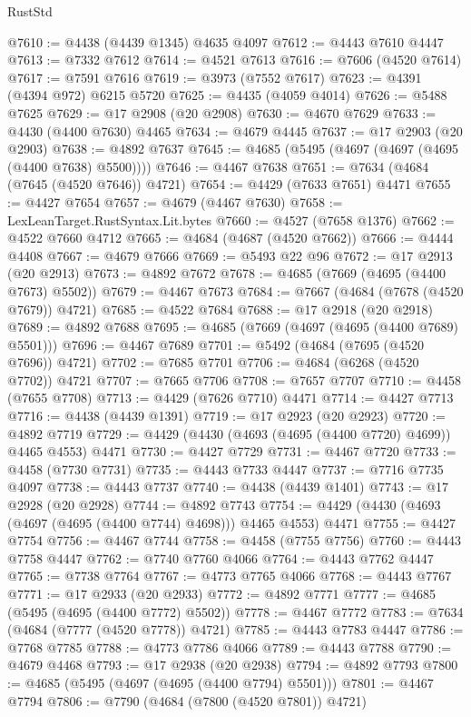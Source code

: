 \begin{lexlean}{RustStd}
\begin{coremodule}
{\begin{coremodule}
{{{{{{{{{{{{{{{{{{{{{{{{{{{{{{{{{{{{{{{{{{{{{{{{{{{{{{{{{{{{{{{{{{{{@7610 := @4438 (@4439 @1345) @4635 @4097
@7612 := @4443 @7610 @4447
@7613 := @7332 @7612
@7614 := @4521 @7613
@7616 := @7606 (@4520 @7614)
@7617 := @7591 @7616
@7619 := @3973 (@7552 @7617)
@7623 := @4391 (@4394 @972) @6215 @5720
@7625 := @4435 (@4059 @4014)
@7626 := @5488 @7625
@7629 := @17 @2908 (@20 @2908)
@7630 := @4670 @7629
@7633 := @4430 (@4400 @7630) @4465
@7634 := @4679 @4445
@7637 := @17 @2903 (@20 @2903)
@7638 := @4892 @7637
@7645 := @4685 (@5495 (@4697 (@4697 (@4695 (@4400 @7638) @5500))))
@7646 := @4467 @7638
@7651 := @7634 (@4684 (@7645 (@4520 @7646)) @4721)
@7654 := @4429 (@7633 @7651) @4471
@7655 := @4427 @7654
@7657 := @4679 (@4467 @7630)
@7658 := LexLeanTarget.RustSyntax.Lit.bytes
@7660 := @4527 (@7658 @1376)
@7662 := @4522 @7660 @4712
@7665 := @4684 (@4687 (@4520 @7662))
@7666 := @4444 @4408
@7667 := @4679 @7666
@7669 := @5493 @22 @96
@7672 := @17 @2913 (@20 @2913)
@7673 := @4892 @7672
@7678 := @4685 (@7669 (@4695 (@4400 @7673) @5502))
@7679 := @4467 @7673
@7684 := @7667 (@4684 (@7678 (@4520 @7679)) @4721)
@7685 := @4522 @7684
@7688 := @17 @2918 (@20 @2918)
@7689 := @4892 @7688
@7695 := @4685 (@7669 (@4697 (@4695 (@4400 @7689) @5501)))
@7696 := @4467 @7689
@7701 := @5492 (@4684 (@7695 (@4520 @7696)) @4721)
@7702 := @7685 @7701
@7706 := @4684 (@6268 (@4520 @7702)) @4721
@7707 := @7665 @7706
@7708 := @7657 @7707
@7710 := @4458 (@7655 @7708)
@7713 := @4429 (@7626 @7710) @4471
@7714 := @4427 @7713
@7716 := @4438 (@4439 @1391)
@7719 := @17 @2923 (@20 @2923)
@7720 := @4892 @7719
@7729 := @4429 (@4430 (@4693 (@4695 (@4400 @7720) @4699)) @4465 @4553) @4471
@7730 := @4427 @7729
@7731 := @4467 @7720
@7733 := @4458 (@7730 @7731)
@7735 := @4443 @7733 @4447
@7737 := @7716 @7735 @4097
@7738 := @4443 @7737
@7740 := @4438 (@4439 @1401)
@7743 := @17 @2928 (@20 @2928)
@7744 := @4892 @7743
@7754 := @4429 (@4430 (@4693 (@4697 (@4695 (@4400 @7744) @4698))) @4465 @4553) @4471
@7755 := @4427 @7754
@7756 := @4467 @7744
@7758 := @4458 (@7755 @7756)
@7760 := @4443 @7758 @4447
@7762 := @7740 @7760 @4066
@7764 := @4443 @7762 @4447
@7765 := @7738 @7764
@7767 := @4773 @7765 @4066
@7768 := @4443 @7767
@7771 := @17 @2933 (@20 @2933)
@7772 := @4892 @7771
@7777 := @4685 (@5495 (@4695 (@4400 @7772) @5502))
@7778 := @4467 @7772
@7783 := @7634 (@4684 (@7777 (@4520 @7778)) @4721)
@7785 := @4443 @7783 @4447
@7786 := @7768 @7785
@7788 := @4773 @7786 @4066
@7789 := @4443 @7788
@7790 := @4679 @4468
@7793 := @17 @2938 (@20 @2938)
@7794 := @4892 @7793
@7800 := @4685 (@5495 (@4697 (@4695 (@4400 @7794) @5501)))
@7801 := @4467 @7794
@7806 := @7790 (@4684 (@7800 (@4520 @7801)) @4721)
}}}}}}}}}}}}}}}}}}}}}}}}}}}}}}}}}}}}}}}}}}}}}}}}}}}}}}}}}}}}}}}}}}}}
\end{coremodule}}
\end{coremodule}
\end{lexlean}
